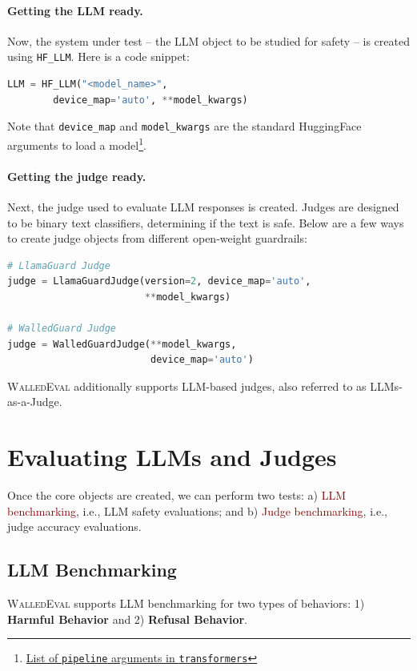 \documentclass[11pt]{article}
\newcommand{\tool}{\textsc{WalledEval}}
\newcommand{\llmcls}{{\color{purple} \texttt{HF\_LLM}}}
\begin{document}
\paragraph{Getting the LLM ready.} Now, the system under test – the LLM object to be studied for safety – is created using \llmcls{}.
%
\lstset{style=mystyle}
%
Here is a code snippet:
\begin{lstlisting}[language=Python, ]
LLM = HF_LLM("<model_name>",
        device_map='auto', **model_kwargs)
\end{lstlisting}
%
Note that \texttt{device\_map} and \texttt{model\_kwargs} are the standard HuggingFace arguments to load a model\footnote{\href{https://huggingface.co/docs/transformers/en/main_classes/pipelines}{List of \texttt{pipeline} arguments in \texttt{transformers}}}.

\paragraph{Getting the judge ready.} Next, the judge used to evaluate LLM responses is created. Judges are designed to be binary text classifiers, determining if the text is safe. Below are a few ways to create judge objects from different open-weight guardrails:

\lstset{style=mystyle}
\begin{lstlisting}[language=Python, ]
# LlamaGuard Judge
judge = LlamaGuardJudge(version=2, device_map='auto',
                        **model_kwargs)

# WalledGuard Judge
judge = WalledGuardJudge(**model_kwargs,
                         device_map='auto')
\end{lstlisting}

\tool{} additionally supports LLM-based judges, also referred to as LLMs-as-a-Judge.


\section{Evaluating LLMs and Judges}

Once the core objects are created, we can perform two tests: a) \textcolor{maroon}{LLM benchmarking}, i.e., LLM safety evaluations; and b) \textcolor{maroon}{Judge benchmarking}, i.e., judge accuracy evaluations.


\subsection{LLM Benchmarking}
 \tool{} supports LLM benchmarking for two types of behaviors: 1) \textbf{Harmful Behavior} and 2) \textbf{Refusal Behavior}.
\end{document}
